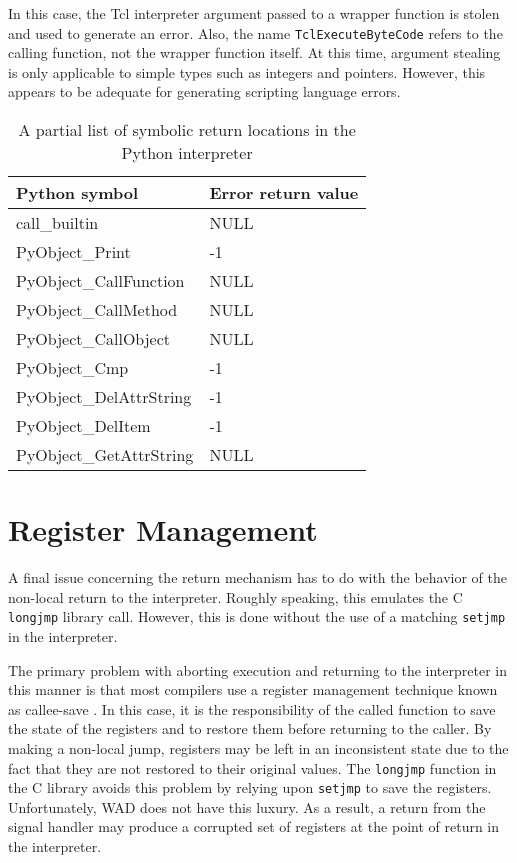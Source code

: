 In this case, the Tcl interpreter argument passed to a wrapper function 
is stolen and used to generate an error.  Also, the name {\tt TclExecuteByteCode}
refers to the calling function, not the wrapper function itself.
At this time, argument stealing is only applicable to simple types
such as integers and pointers.  However, this appears to be adequate for generating
scripting language errors.


\begin{table}[t]
\begin{center}
\begin{tabular}{ll}
Python symbol                 &   Error return value \\ \hline
call\_builtin                 &   NULL \\
PyObject\_Print               & -1 \\
PyObject\_CallFunction        & NULL \\
PyObject\_CallMethod          & NULL \\
PyObject\_CallObject          & NULL \\
PyObject\_Cmp                 & -1 \\
PyObject\_DelAttrString       & -1 \\
PyObject\_DelItem             & -1 \\
PyObject\_GetAttrString       & NULL \\
\end{tabular}
\end{center}

\label{returnpoints}
\caption{A partial list of symbolic return locations in the Python interpreter}
\end{table}

\section{Register Management}

A final issue concerning the return mechanism has to do with the
behavior of the non-local return to the interpreter.  Roughly
speaking, this emulates the C {\tt longjmp}
library call.  However, this is done without the use of a matching
{\tt setjmp} in the interpreter.  

The primary problem with aborting execution and returning to the
interpreter in this manner is that most compilers use a register
management technique known as callee-save \cite{prag}.  In this case,
it is the responsibility of the called function to save the state of
the registers and to restore them before returning to the caller. By
making a non-local jump, registers may be left in an inconsistent
state due to the fact that they are not restored to their original
values.  The {\tt longjmp} function in the C library avoids this
problem by relying upon {\tt setjmp} to save the registers.  Unfortunately,
WAD does not have this luxury.   As a result, a return from the signal
handler may produce a corrupted set of registers at the point of return
in the interpreter.

